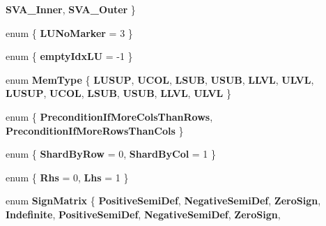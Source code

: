 \begin{DoxyCompactItemize}
{\bfseries S\+V\+A\+\_\+\+Inner}, 
{\bfseries S\+V\+A\+\_\+\+Outer}
 \}
\item 
\mbox{\label{namespace_eigen_1_1internal_a9750f3e6249ccbea7301197f28b1a7fe}} 
enum \{ {\bfseries L\+U\+No\+Marker} = 3
 \}
\item 
\mbox{\label{namespace_eigen_1_1internal_a7b9d9f6539c2fa81cf1be504cebf04a8}} 
enum \{ {\bfseries empty\+Idx\+LU} = -\/1
 \}
\item 
\mbox{\label{namespace_eigen_1_1internal_a5ada550dfc9d36503a814391f7f68fc9}} 
enum {\bfseries Mem\+Type} \{ \newline
{\bfseries L\+U\+S\+UP}, 
{\bfseries U\+C\+OL}, 
{\bfseries L\+S\+UB}, 
{\bfseries U\+S\+UB}, 
\newline
{\bfseries L\+L\+VL}, 
{\bfseries U\+L\+VL}, 
{\bfseries L\+U\+S\+UP}, 
{\bfseries U\+C\+OL}, 
\newline
{\bfseries L\+S\+UB}, 
{\bfseries U\+S\+UB}, 
{\bfseries L\+L\+VL}, 
{\bfseries U\+L\+VL}
 \}
\item 
\mbox{\label{namespace_eigen_1_1internal_ad5f8c243288e90f14a26a404a73a991b}} 
enum \{ {\bfseries Precondition\+If\+More\+Cols\+Than\+Rows}, 
{\bfseries Precondition\+If\+More\+Rows\+Than\+Cols}
 \}
\item 
\mbox{\label{namespace_eigen_1_1internal_a3fd715b4c44f1e08cc014b4ba835d7c3}} 
enum \{ {\bfseries Shard\+By\+Row} = 0, 
{\bfseries Shard\+By\+Col} = 1
 \}
\item 
\mbox{\label{namespace_eigen_1_1internal_ad56c971581fcce94adef1c9a4ff49571}} 
enum \{ {\bfseries Rhs} = 0, 
{\bfseries Lhs} = 1
 \}
\item 
\mbox{\label{namespace_eigen_1_1internal_a39fc8ba8ec6e221fec1919403dac3b1b}} 
enum {\bfseries Sign\+Matrix} \{ \newline
{\bfseries Positive\+Semi\+Def}, 
{\bfseries Negative\+Semi\+Def}, 
{\bfseries Zero\+Sign}, 
{\bfseries Indefinite}, 
\newline
{\bfseries Positive\+Semi\+Def}, 
{\bfseries Negative\+Semi\+Def}, 
{\bfseries Zero\+Sign}, 

\end{DoxyCompactItemize}
